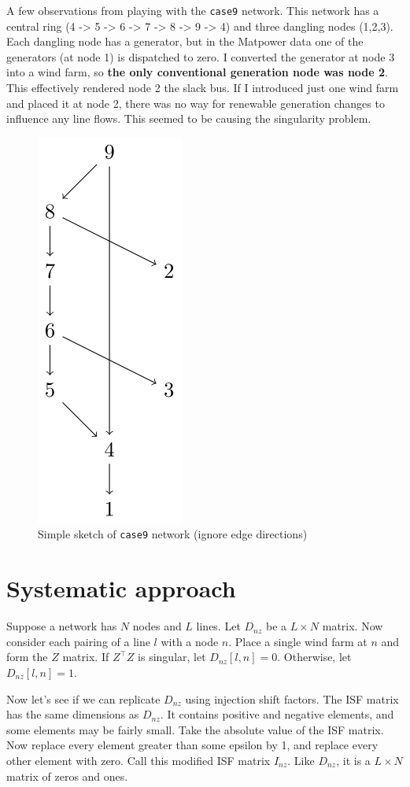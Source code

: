 \documentclass[10pt,letterpaper]{article}
\begin{document}
A few observations from playing with the \texttt{case9} network. This network has a central ring (4 -\textgreater{} 5
-\textgreater{} 6 -\textgreater{} 7 -\textgreater{} 8 -\textgreater{} 9
-\textgreater{} 4) and three dangling nodes (1,2,3). Each dangling node
has a generator, but in the Matpower data one of the generators (at node
1) is dispatched to zero. I converted the generator at node 3 into a
wind farm, so \textbf{the only conventional generation node was node 2}.
This effectively rendered node 2 the slack bus. If I
introduced just one wind farm and placed it at node 2, there was no way for renewable generation changes
to influence any line flows. This seemed to be causing the singularity problem.

\begin{figure}[h]
\centering
\includegraphics[width=0.16\linewidth]{"../images/case9graph"}
\caption{Simple sketch of \texttt{case9} network (ignore edge directions)}
\label{fig:case9}
\end{figure}

    \section*{Systematic approach}\label{systematic-approach}

Suppose a network has \(N\) nodes and \(L\) lines. Let \(D_{nz}\) be a
\(L\times N\) matrix. Now consider each pairing of a line \(l\) with a
node \(n\). Place a single wind farm at \(n\) and form the \(Z\) matrix.
If \(Z^\top Z\) is singular, let \(D_{nz}[l,n] = 0\). Otherwise, let
\(D_{nz}[l,n] = 1\).

Now let's see if we can replicate \(D_{nz}\) using injection shift
factors. The ISF matrix has the same dimensions as \(D_{nz}\). It
contains positive and negative elements, and some elements may be fairly
small. Take the absolute value of the ISF matrix. Now replace every
element greater than some epsilon by 1, and replace every other element
with zero. Call this modified ISF matrix \(I_{nz}\). Like \(D_{nz}\), it
is a \(L\times N\) matrix of zeros and ones.
\end{document}
